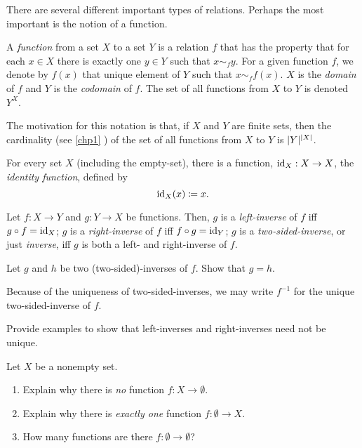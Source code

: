 There are several different important types of relations.  Perhaps the most important is the notion of a function.
\begin{dfn}[Function]
A \emph{function} from a set $X$ to a set $Y$ is a relation $f$ that has the property that for each $x\in X$ there is exactly one $y\in Y$ such that $x\sim _fy$.  For a given function $f$, we denote by $f(x)$ that unique element of $Y$ such that $x\sim _ff(x)$.  $X$ is the \emph{domain} of $f$ and $Y$ is the \emph{codomain} of $f$.  The set of all functions from $X$ to $Y$ is denoted $Y^X$.
\begin{rmk}
The motivation for this notation is that, if $X$ and $Y$ are finite sets, then the cardinality (see \cref{chp1} ) of the set of all functions from $X$ to $Y$ is $\lvert Y\rvert^{\lvert X\rvert}$.
\end{rmk}
\end{dfn}
\begin{exm}
For every set $X$ (including the empty-set), there is a function, $\operatorname{id} _X:X\rightarrow X$, the \emph{identity function}, defined by
\begin{equation}
\operatorname{id} _X(x)\coloneqq x.
\end{equation}
\end{exm}
\begin{dfn}
Let $f:X\rightarrow Y$ and $g:Y\rightarrow X$ be functions.  Then, $g$ is a \emph{left-inverse} of $f$ iff $g\circ f=\operatorname{id} _X$; $g$ is a \emph{right-inverse} of $f$ iff $f\circ g=\operatorname{id} _Y$; $g$ is a \emph{two-sided-inverse}, or just \emph{inverse}, iff $g$ is both a left- and right-inverse of $f$.
\begin{exr}
Let $g$ and $h$ be two (two-sided)-inverses of $f$.  Show that $g=h$.
\end{exr}
Because of the uniqueness of two-sided-inverses, we may write $f^{-1}$ for the unique two-sided-inverse of $f$.
\end{dfn}
\begin{exr}
Provide examples to show that left-inverses and right-inverses need not be unique.
\end{exr}
\begin{exr}\label{exrA.1.23}
Let $X$ be a nonempty set.
\begin{enumerate}
\item \label{enmA.1.23.i}Explain why there is \emph{no} function $f:X\rightarrow \emptyset$.
\item \label{enmA.1.23.ii}Explain why there is \emph{exactly one} function $f:\emptyset \rightarrow X$.
\item \label{enmA.1.23.iii}How many functions are there $f:\emptyset \rightarrow \emptyset$?
\end{enumerate}
\end{exr}
